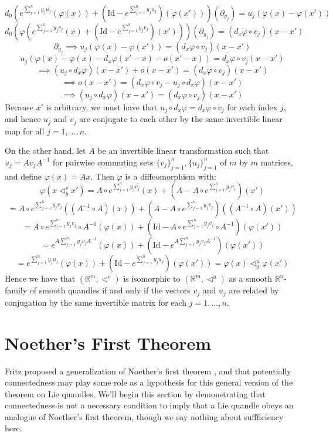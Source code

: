 \documentclass[12pt]{amsart}
\theoremstyle{plain}
\theoremstyle{definition}
\begin{document}
$$  d_0(e^{ \sum_{j=1}^ny_j u_j }(\varphi(x)) + (\text{Id} - e^{\sum_{j=1}^ny_j u_j })(\varphi(x')))( \partial_{y_j} ) =   u_j (\varphi(x) -  \varphi(x')) $$
$$ d_0(\varphi(e^{\sum_{j=1}^ny_j v_j }(x) + (\text{Id} - e^{\sum_{j=1}^ny_j v_j })(x') ) )(\partial_{y_j})  =(d_x\varphi \circ v_j) (x   -  x')  $$
$$ \partial_{y_j}  \implies  u_j(\varphi(x) -  \varphi(x')) =  (d_x\varphi\circ  v_j)(x   -  x')  $$
$$    u_j(\varphi(x) -   \varphi(x) - d_x\varphi(x'-x) - o(x'-x)) =  d_x\varphi\circ  v_j(x   -  x')  $$
 $$  \implies   (u_j\circ  d_x\varphi )(x-x') + o(x-x') = ( d_x\varphi\circ  v_j)(x   -  x')  $$
$$  \implies    o(x-x') =    (d_x\varphi\circ v_j -u_j \circ  d_x\varphi)(x-x') $$
$$  \implies   (u_j \circ  d_x\varphi )(x-x') =    (d_x\varphi\circ v_j)(x-x') $$
Because $x'$ is arbitrary, we must have that $u_j \circ  d_x\varphi = d_x\varphi\circ v_j$ for each index $j$, and hence $u_j$ and $v_j$ are conjugate to each other by the same invertible linear map for all $j=1,...,n$.

 
 On the other hand, let $A$ be an invertible linear transformation such that $u_j = Av_jA^{-1}$ for pairwise commuting sets $\{v_j\}_{j=1}^n,\{u_j\}_{j=1}^n$ of $m$ by $m$ matrices, and define $\varphi(x) = Ax$. Then $\varphi$ is a diffeomorphism with:
 $$ \varphi (x\triangleleft_y^vx' ) = A\circ e^{\sum_{j=1}^ny_j v_j}(x)+(A-A\circ e^{\sum_{j=1}^ny_j v_j})(x') $$
 $$= A\circ e^{\sum_{j=1}^ny_j v_j}((A^{-1}\circ A )(x))+(A -A \circ e^{\sum_{j=1}^ny_j v_j})( (A^{-1} \circ A )(x')) $$
  $$= A \circ e^{\sum_{j=1}^ny_j v_j}\circ A^{-1}  (\varphi(x))+(\text{Id}-A \circ e^{\sum_{j=1}^ny_j v_j}\circ A^{-1})(  \varphi(x')) $$
  $$=  e^{A  \sum_{j=1}^ny_j v_j A^{-1}}  (\varphi(x))+(\text{Id}- e^{  A \sum_{j=1}^ny_j v_j A^{-1}})(  \varphi(x'))  $$
   $$=  e^{\sum_{j=1}^ny_j u_j}  (\varphi(x))+(\text{Id}- e^{ \sum_{j=1}^ny_j u_j})(  \varphi(x')) = \varphi(x) \triangleleft_y^u \varphi(x') $$
   Hence we have that $(\mathbb{R}^m,\triangleleft^v)$ is isomorphic to $(\mathbb{R}^m,\triangleleft^u)$ as a smooth $\mathbb{R}^n$-family of smooth quandles if and only if the vectors $v_j$ and $u_j$ are related by conjugation by the same invertible matrix for each $j =1,...,n$.
   
    \section{Noether's First Theorem} \label{Sec5}



Fritz proposed a generalization of Noether's first theorem \cite{Fritz} , and that potentially connectedness may play some role as a hypothesis for this general version of the theorem on Lie quandles. We'll begin this section by demonstrating that connectedness is not a necessary condition to imply that a Lie quandle obeys an analogue of Noether's first theorem, though we say nothing about suffficiency here. 
\end{document}
